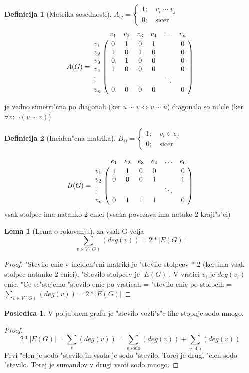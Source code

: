 \documentclass{article}
\let\bbordermatrix\bordermatrix
\theoremstyle{definition}
\newtheorem{definition}{Definicija}[section]
\newtheorem{lemma}{Lema}[section]
\newtheorem{conseq}{Posledica}[section]
\begin{document}
	\begin{definition}[Matrika sosednosti]
	$A_{ij} = \begin{cases}1; \quad v_i \sim v_j \\ 0; \quad \text{sicer} \end{cases}$
	$$
		A(G) =
		\bbordermatrix{
			    & v_1 & v_2 & v_3 & v_4 &\ldots& v_n \cr
			v_1 &  0  &  1  &  0  &  1  &      &  0  \cr
			v_2 &  1  &  0  &  1  &  0  &      &  0  \cr
			v_3 &  0  &  1  &  0  &  0  &      &  0  \cr
			v_4 &  1  &  0  &  0  &  0  &      &  0  \cr
		 \vdots &     &     &     &     &\ddots&     \cr
			v_n &  0  &  0  &  0  &  0  &      &  0  \cr
		}
	$$
	\end{definition}
	je vedno simetri"cna po diagonali (ker $u \sim v \iff v \sim u$)
	diagonala so ni"cle (ker $\forall v: \lnot(v \sim v)$)
	
	
	\begin{definition}[Inciden"cna matrika] 
		$B_{ij} = \begin{cases}1; \quad v_i \in e_j \\ 0;  \quad \text{sicer} \end{cases}$
		
		$$
			B(G) =
			\bbordermatrix{
			    & e_1 & e_2 & e_3 & e_4 &\ldots& e_6 \cr 
			v_1 &  1  &  1  &  0  &  0  &      &  0 \cr 
			v_2 &  0  &  0  &  0  &  1  &      &  1 \cr
		 \vdots &     &     &     &     &\ddots&    \cr
			v_n &  0  &  1  &  1  &  1  &      &  0 \cr
			}
		$$
		vsak stolpec ima natanko 2 enici (vsaka povezava ima natako 2 kraji"s"ci)
	\end{definition}
	
	\begin{lemma}[Lema o rokovanju]
		za vsak G velja
		\[ \sum_{v \in V(G)} (deg(v)) = 2*|E(G)| \]
		\begin{proof}
			"Stevilo enic v inciden"cni matriki je "stevilo stolpcev $*$ 2 (ker ima vsak stolpec natanko 2 enici). "Stevilo stolpcev je $|E(G)|$.
			V vrstici $v_i$ je $deg(v_i)$ enic. "Ce se"stejemo "stevilo enic po vrsticah = "stevilo enic po stolpcih = $\sum_{v \in V(G)}(deg(v)) = 2*|E(G)|$
		\end{proof}
	\end{lemma}
	
	\begin{conseq} 
		V poljubnem grafu je "stevilo vozli"s"c lihe stopnje sodo mnogo. 
		\begin{proof}
			\[ 2*|E(G)| = \sum_{v}(deg(v)) = \sum_{v \text{ sodo}}(deg(v)) + \sum_{v \text{ liho}}(deg(v)) \] 
			Prvi "clen je sodo "stevilo in vsota je sodo "stevilo. Torej je drugi "clen sodo "stevilo. Torej je sumandov v drugi vsoti sodo mnogo.
		\end{proof}
	\end{conseq}
	
\end{document}
